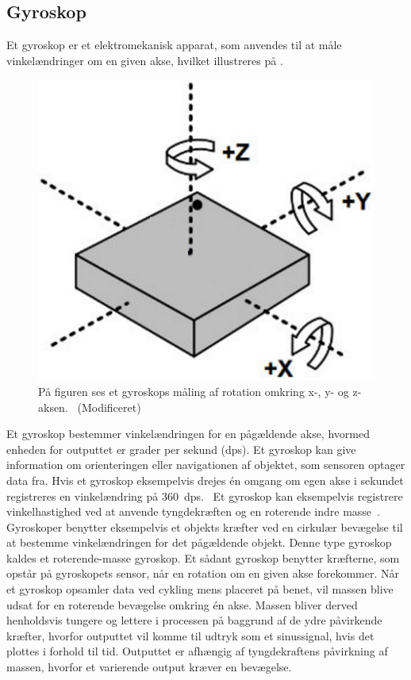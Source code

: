 \subsection{Gyroskop}
Et gyroskop er et elektromekanisk apparat, som anvendes til at måle vinkelændringer om en given akse, hvilket illustreres på . 
\begin{figure}[H]
	\centering
	\includegraphics[scale=0.4]{figures/bProblemloesning/gyro.png}
	\caption{På figuren ses et gyroskops måling af rotation omkring x-, y- og z-aksen.~\citep{Sparkfun_gyro} (Modificeret)}
	\label{fig:gyro}
\end{figure}\vspace{-.25cm}
Et gyroskop bestemmer vinkelændringen for en pågældende akse, hvormed enheden for outputtet er grader per sekund (dps). Et gyroskop kan give information om orienteringen eller navigationen af objektet, som sensoren optager data fra. Hvis et gyroskop eksempelvis drejes én omgang om egen akse i sekundet registreres en vinkelændring på 360~dps.~\citep{Sparkfun_gyro,Barbour2014} \newline
Et gyroskop kan eksempelvis registrere vinkelhastighed ved at anvende tyngdekræften og en roterende indre masse~\citep{Sparkfun_gyro,Barbour2014}. Gyroskoper benytter eksempelvis et objekts kræfter ved en cirkulær bevægelse til at bestemme vinkelændringen for det pågældende objekt. Denne type gyroskop kaldes et roterende-masse gyroskop. Et sådant gyroskop benytter kræfterne, som opstår på gyroskopets sensor, når en rotation om en given akse forekommer. Når et gyroskop opsamler data ved cykling mens placeret på benet, vil massen blive udsat for en roterende bevægelse omkring én akse. Massen bliver derved henholdsvis tungere og lettere i processen på baggrund af de ydre påvirkende kræfter, hvorfor outputtet vil komme til udtryk som et sinussignal, hvis det plottes i forhold til tid. Outputtet er afhængig af tyngdekraftens påvirkning af massen, hvorfor et varierende output kræver en bevægelse.~\citep{TittertonWeston2004,Barbour2014,LuingeVeltink2005}

